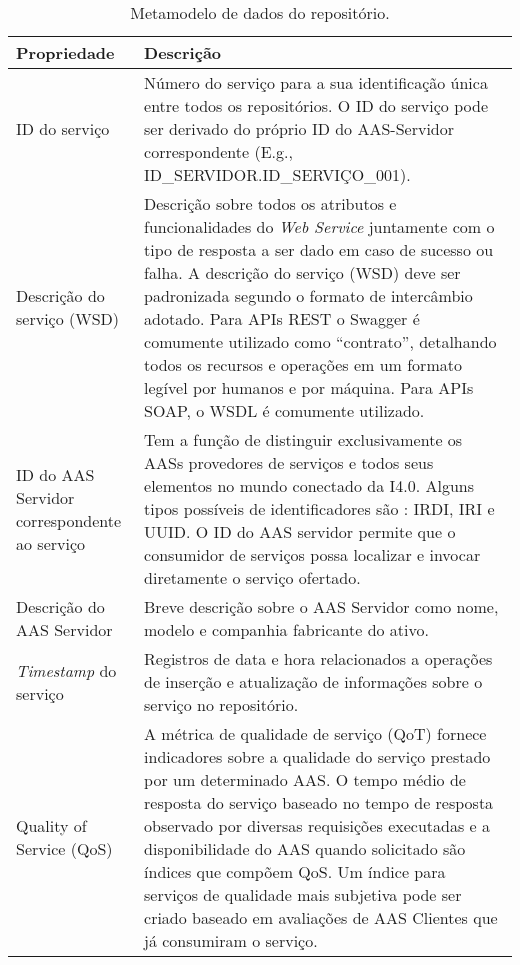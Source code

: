 	\begin{table}[htb]
		\centering
		\caption{Metamodelo de dados do repositório.}
		\label{tab:mdp-repositorio}
		\begin{tabular}{p{3cm}p{12cm}}
			\hline
			\textbf{Propriedade}
			& \textbf{Descrição} \\ 
			
			\hline
			ID do serviço
			& Número do serviço para a sua identificação única entre todos os repositórios. O ID do serviço pode ser derivado do próprio ID do AAS-Servidor correspondente (E.g., ID\_SERVIDOR.ID\_SERVIÇO\_001). \\
			
			\hline
			Descrição do serviço (WSD)
			& Descrição sobre todos os atributos e funcionalidades do \textit{Web Service} juntamente com o tipo de resposta a ser dado em caso de sucesso ou falha. A descrição do serviço (WSD) deve ser padronizada segundo o formato de intercâmbio adotado. Para APIs REST o Swagger é comumente utilizado como ``contrato'', detalhando todos os recursos e operações em um formato legível por humanos e por máquina. Para APIs SOAP, o WSDL é comumente utilizado. \\
			
			\hline
			ID do AAS Servidor correspondente ao serviço
			& Tem a função de distinguir exclusivamente os AASs provedores de serviços e todos seus elementos \cite{adolphs2016structure} no mundo conectado da I4.0. Alguns tipos possíveis de identificadores são \cite{bader2019aas}: IRDI, IRI e UUID. O ID do AAS servidor permite que o consumidor de serviços possa localizar e invocar diretamente o serviço ofertado. \\
			
			\hline
			Descrição do AAS Servidor
			& Breve descrição sobre o AAS Servidor como nome, modelo e companhia fabricante do ativo. \\	
			
			\hline
			\textit{Timestamp} do serviço
			& Registros de data e hora relacionados a operações de inserção e atualização de informações sobre o serviço no repositório. \\
			
			\hline
			Quality of Service (QoS)
			& A métrica de qualidade de serviço (QoT) fornece indicadores sobre a qualidade do serviço prestado por um determinado AAS. O tempo médio de resposta do serviço baseado no tempo de resposta observado por diversas requisições executadas e a disponibilidade do AAS quando solicitado são índices que compõem QoS. Um índice para serviços de qualidade mais subjetiva pode ser criado baseado em avaliações de AAS Clientes que já consumiram o serviço.\\
			
			
			\hline
		\end{tabular}
	\end{table}
	
